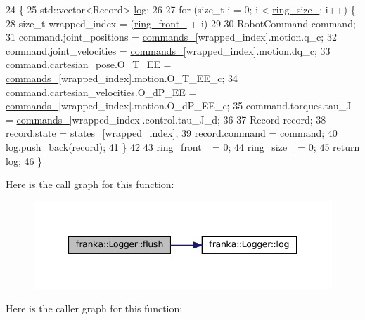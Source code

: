 \begin{DoxyCode}
24                                 \{
25   std::vector<Record> \hyperlink{classfranka_1_1Logger_aee4bfea6a4081c4ed9ee2abd2f62a0cd}{log};
26 
27   \textcolor{keywordflow}{for} (\textcolor{keywordtype}{size\_t} i = 0; i < \hyperlink{classfranka_1_1Logger_ab70ce51d314081d2f467a6dfbf1f80a4}{ring\_size\_}; i++) \{
28     \textcolor{keywordtype}{size\_t} wrapped\_index = (\hyperlink{classfranka_1_1Logger_ac8b62b201f384202b095b68babe0a8da}{ring\_front\_} + i) %
29 
30     RobotCommand command;
31     command.joint\_positions = \hyperlink{classfranka_1_1Logger_acbc69d24663395732ac72d274146eb5f}{commands\_}[wrapped\_index].motion.q\_c;
32     command.joint\_velocities = \hyperlink{classfranka_1_1Logger_acbc69d24663395732ac72d274146eb5f}{commands\_}[wrapped\_index].motion.dq\_c;
33     command.cartesian\_pose.O\_T\_EE = \hyperlink{classfranka_1_1Logger_acbc69d24663395732ac72d274146eb5f}{commands\_}[wrapped\_index].motion.O\_T\_EE\_c;
34     command.cartesian\_velocities.O\_dP\_EE = \hyperlink{classfranka_1_1Logger_acbc69d24663395732ac72d274146eb5f}{commands\_}[wrapped\_index].motion.O\_dP\_EE\_c;
35     command.torques.tau\_J = \hyperlink{classfranka_1_1Logger_acbc69d24663395732ac72d274146eb5f}{commands\_}[wrapped\_index].control.tau\_J\_d;
36 
37     Record record;
38     record.state = \hyperlink{classfranka_1_1Logger_aea60d37797979d786e7653168cf49ecb}{states\_}[wrapped\_index];
39     record.command = command;
40     log.push\_back(record);
41   \}
42 
43   \hyperlink{classfranka_1_1Logger_ac8b62b201f384202b095b68babe0a8da}{ring\_front\_} = 0;
44   ring\_size\_ = 0;
45   \textcolor{keywordflow}{return} \hyperlink{classfranka_1_1Logger_aee4bfea6a4081c4ed9ee2abd2f62a0cd}{log};
46 \}
\end{DoxyCode}
Here is the call graph for this function\+:
\nopagebreak
\begin{figure}[H]
\begin{center}
\leavevmode
\includegraphics[width=340pt]{classfranka_1_1Logger_a44b15a95e25dabe93f797c1d9651fb6e_cgraph}
\end{center}
\end{figure}
Here is the caller graph for this function\+:
